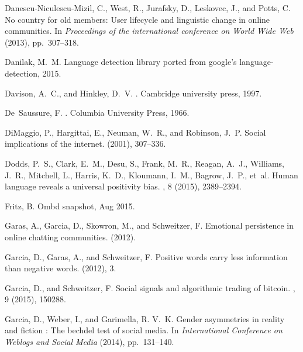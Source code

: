 \documentclass[letterpaper]{sig-alternate-2013}
\begin{document}
\begin{thebibliography}{10}
{\sc Danescu-Niculescu-Mizil, C., West, R., Jurafsky, D., Leskovec, J., and
  Potts, C.}
\newblock No country for old members: User lifecycle and linguistic change in
  online communities.
\newblock In {\em Proceedings of the international conference on World Wide
  Web\/} (2013), pp.~307--318.

{\sc Danilak, M.~M.}
\newblock Language detection library ported from google's language-detection,
  2015.

{\sc Davison, A.~C., and Hinkley, D.~V.}
.
\newblock Cambridge university press, 1997.

{\sc De~Saussure, F.}
.
\newblock Columbia University Press, 1966.

{\sc DiMaggio, P., Hargittai, E., Neuman, W.~R., and Robinson, J.~P.}
\newblock Social implications of the internet.
 (2001), 307--336.

{\sc Dodds, P.~S., Clark, E.~M., Desu, S., Frank, M.~R., Reagan, A.~J.,
  Williams, J.~R., Mitchell, L., Harris, K.~D., Kloumann, I.~M., Bagrow, J.~P.,
  et~al.}
\newblock Human language reveals a universal positivity bias.
, 8 (2015),
  2389--2394.

{\sc Fritz, B.}
\newblock Ombd snapshot, Aug 2015.

{\sc Garas, A., Garcia, D., Skowron, M., and Schweitzer, F.}
\newblock Emotional persistence in online chatting communities.
 (2012).

{\sc Garcia, D., Garas, A., and Schweitzer, F.}
\newblock Positive words carry less information than negative words.
 (2012), 3.

{\sc Garcia, D., and Schweitzer, F.}
\newblock Social signals and algorithmic trading of bitcoin.
, 9 (2015), 150288.

{\sc Garcia, D., Weber, I., and Garimella, R. V.~K.}
\newblock Gender asymmetries in reality and fiction : The bechdel test of
  social media.
\newblock In {\em International Conference on Weblogs and Social Media\/}
  (2014), pp.~131--140.


\end{thebibliography}
\end{document}
